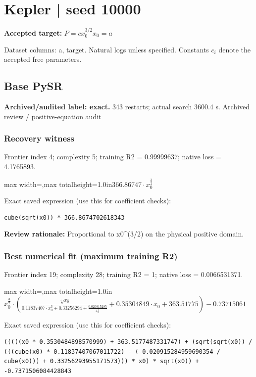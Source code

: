 \documentclass[10pt,letterpaper,landscape]{article}
\begin{document}
\section*{Kepler | seed 10000}
\textbf{Accepted target:} $\displaystyle P=c x_0^{3/2}$\hfill $x_0=a$\par
{\small Dataset columns: a, target. Natural logs unless specified. Constants $c_i$ denote the accepted free parameters.}\par\medskip
\begin{minipage}[t]{0.485\textwidth}
\subsection*{Base PySR}
\textbf{Archived/audited label: exact.} 343 restarts; actual search 3600.4 s.
{\small Archived review / positive-equation audit}
\subsubsection*{Recovery witness}
Frontier index 4; complexity 5; training R2 = 0.99999637; native loss = 4.1765893.
\begin{center}\begin{adjustbox}{max width=\linewidth,max totalheight=1.0in}$\displaystyle 366.86747 \cdot x_{0}^{\frac{3}{2}}$\end{adjustbox}\end{center}
{\scriptsize Exact saved expression (use this for coefficient checks):}
\begin{lstlisting}
cube(sqrt(x0)) * 366.8674702618343
\end{lstlisting}
{\small\textbf{Review rationale:} Proportional to x0\textasciicircum{}(3/2) on the physical positive domain.}
\subsubsection*{Best numerical fit (maximum training R2)}
Frontier index 19; complexity 28; training R2 = 1; native loss = 0.0066531371.
\begin{center}\begin{adjustbox}{max width=\linewidth,max totalheight=1.0in}$\displaystyle x_{0}^{\frac{3}{2}} \cdot \left(\frac{\sqrt[4]{x_{0}}}{0.11837407 \cdot x_{0}^{3} + 0.33256294 + \frac{0.020915285}{x_{0}^{3}}} + 0.35304849 \cdot x_{0} + 363.51775\right) - 0.73715061$\end{adjustbox}\end{center}
{\scriptsize Exact saved expression (use this for coefficient checks):}
\begin{lstlisting}
(((((x0 * 0.3530484898570999) + 363.5177487331747) + (sqrt(sqrt(x0)) / (((cube(x0) * 0.11837407067011722) - (-0.020915284959690354 / cube(x0))) + 0.33256293955171573))) * x0) * sqrt(x0)) + -0.7371506084428843
\end{lstlisting}
\end{minipage}\hfill
\end{document}
